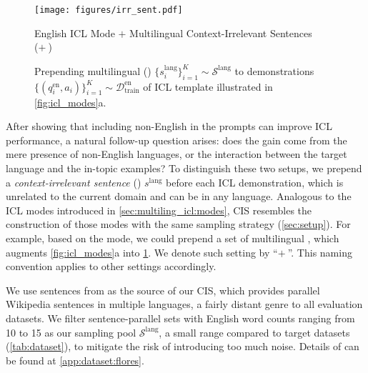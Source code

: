 \begin{figure}[!t]
    \centering
    \texttt{[image: figures/irr\_sent.pdf]}
    \centering
    {\scriptsize
        \parbox{\linewidth}{%
            \centering
            English ICL Mode $+$ Multilingual Context-Irrelevant Sentences\\
            (\english$+\ $\cisMulti)
        }
    }
    \vspace{-18pt}
    \caption{Prepending multilingual \cis (\cisMulti) $\{s_i^{\text{lang}}\}_{i=1}^K \sim \mathcal{S}^{\text{lang}}$ to demonstrations $\{(q_i^{\text{en}}, a_i)\}_{i=1}^K \sim \mathcal{D}_\text{train}^{\text{en}}$ of \english ICL template illustrated in \cref{fig:icl_modes}a.}
    \label{fig:irr_sent_illustration}
    \vspace{-5pt}
\end{figure}



After showing that including non-English in the prompts can improve ICL performance, a natural follow-up question arises: does the gain come from the mere presence of non-English languages, or the interaction between the target language and the in-topic examples? 
To distinguish these two setups, we prepend a \textit{context-irrelevant sentence} (\cis) $s^{\text{lang}}$ before each ICL demonstration, which is unrelated to the current domain and can be in any language.
Analogous to the ICL modes introduced in \cref{sec:multiling_icl:modes}, CIS resembles the construction of those modes with the same sampling strategy (\cref{sec:setup}).
For example, based on the \english mode, we could prepend a set of multilingual \cis, which augments \cref{fig:icl_modes}a into \cref{fig:irr_sent_illustration}. We denote such setting by ``\english$+\ $\cisMulti''. This naming convention applies to other settings accordingly.


We use sentences from \flores \cite{flores101} as the source of our CIS, which provides parallel Wikipedia sentences in multiple languages, a fairly distant genre to all evaluation datasets.
We filter sentence-parallel sets with English word counts ranging from 10 to 15 as our sampling pool $\mathcal{S}^\text{lang}$, a small range compared to target datasets (\cref{tab:dataset}), to mitigate the risk of introducing too much noise.
Details of \flores can be found at \cref{app:dataset:flores}.

